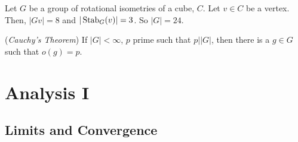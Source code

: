 \documentclass[10pt, a4paper, twoside]{report}
\begin{document}
\begin{example}
    Let \(G\) be a group of rotational isometries of a cube, \(C\). Let \(v\in C\) be a vertex. Then, \(|Gv|=8\) and \(|\operatorname{Stab}_G(v)|=3\). So \(|G|=24\).
\end{example}
\begin{theorem}
    (\emph{Cauchy's Theorem}) If \(|G|<\infty\), \(p\) prime such that \(p\big||G|\), then there is a \(g\in G\) such that \(o(g)=p\).
\end{theorem}
\chapter{Analysis I}
\section{Limits and Convergence}
\end{document}

